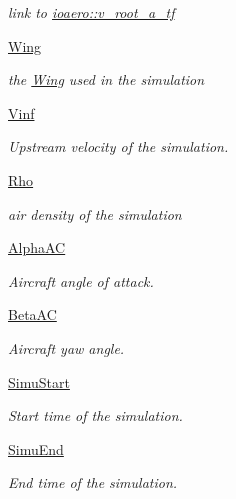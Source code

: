\begin{DoxyCompactItemize}
\begin{DoxyCompactList}\small\item\em link to \hyperlink{namespaceioaero_adb4e11942a388b1bf1f13d10c79614bc}{ioaero\+::v\+\_\+root\+\_\+a\+\_\+tf} \end{DoxyCompactList}\item 
\hyperlink{classgebtaero_1_1_input_file_1_1_input_file_aef106e7014301b5094f9ebd82637f282}{Wing}
\begin{DoxyCompactList}\small\item\em the \hyperlink{namespacegebtaero_1_1_wing}{Wing} used in the simulation \end{DoxyCompactList}\item 
\hyperlink{classgebtaero_1_1_input_file_1_1_input_file_aa219468b0f01af23063dbf55c5d40e1b}{Vinf}
\begin{DoxyCompactList}\small\item\em Upstream velocity of the simulation. \end{DoxyCompactList}\item 
\hyperlink{classgebtaero_1_1_input_file_1_1_input_file_a71105300fe8cf88253e38529768b998e}{Rho}
\begin{DoxyCompactList}\small\item\em air density of the simulation \end{DoxyCompactList}\item 
\hyperlink{classgebtaero_1_1_input_file_1_1_input_file_a1bf2ed2352dca0749990cccb737fef5a}{Alpha\+AC}
\begin{DoxyCompactList}\small\item\em Aircraft angle of attack. \end{DoxyCompactList}\item 
\hyperlink{classgebtaero_1_1_input_file_1_1_input_file_a20868cef3eeb8d6c140d62d2d2252657}{Beta\+AC}
\begin{DoxyCompactList}\small\item\em Aircraft yaw angle. \end{DoxyCompactList}\item 
\hyperlink{classgebtaero_1_1_input_file_1_1_input_file_a76efb85d94155e3065ed0139ee3adc5f}{Simu\+Start}
\begin{DoxyCompactList}\small\item\em Start time of the simulation. \end{DoxyCompactList}\item 
\hyperlink{classgebtaero_1_1_input_file_1_1_input_file_a94164f915c41a24c95ad025f34b7cbcc}{Simu\+End}
\begin{DoxyCompactList}\small\item\em End time of the simulation. \end{DoxyCompactList}\item 

\end{DoxyCompactItemize}
